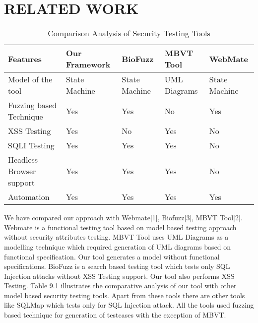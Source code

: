 \chapter{RELATED WORK}

\begin{table}[!ht]
\caption{Comparison Analysis of Security Testing Tools}
\label{Comparitive Analysis of Security Testing Tools}
\begin{tabular}{|l|l|l|l|l|}
\hline
Features                 & Our Framework & BioFuzz       & MBVT Tool    & WebMate       \\
\hline
Model of the tool        & State Machine & State Machine & UML Diagrams & State Machine \\
\hline
Fuzzing based Technique  & Yes           & Yes           & No          & Yes           \\
\hline
XSS Testing              & Yes           & No            & Yes          & No            \\
\hline
SQLI Testing             & Yes           & Yes           & Yes           & No            \\
\hline
Headless Browser support & Yes           & Yes           & Yes           & No            \\
\hline
Automation               & Yes           & Yes           & Yes          & Yes\\
\hline
\end{tabular}
\end{table}

We have compared our approach with Webmate[1], Biofuzz[3], MBVT Tool[2]. Webmate is a functional testing tool based on model based testing approach without security attributes testing. MBVT Tool uses UML Diagrams as a modelling technique which required generation of UML diagrams based on functional specification. Our tool generates a model without functional specifications. BioFuzz is a search based testing tool which tests only SQL Injection attacks without XSS Testing support. Our tool also performs XSS Testing. Table 9.1 illustrates the comparative analysis of our tool with other model based security testing tools. Apart from these tools there are other tools like SQLMap which tests only for SQL Injection attack. All the tools used fuzzing based technique for generation of testcases with the exception of MBVT.
